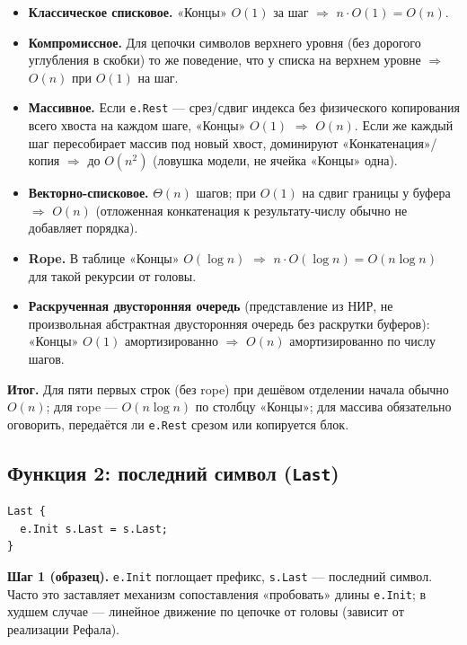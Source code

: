 \documentclass[12pt,a4paper]{article}
\newcommand{\bigO}{\ensuremath{O}}
\begin{document}
\begin{itemize}
  \item \textbf{Классическое списковое.} «Концы» \(O(1)\) за шаг \(\Rightarrow\) \(n\cdot O(1)=\bigO(n)\).
  \item \textbf{Компромиссное.} Для цепочки символов верхнего уровня (без дорогого углубления в скобки) то же поведение, что у списка на верхнем уровне \(\Rightarrow\) \(\bigO(n)\) при \(O(1)\) на шаг.
  \item \textbf{Массивное.} Если \texttt{e.Rest} --- срез/сдвиг индекса без физического копирования всего хвоста на каждом шаге, «Концы» \(O(1)\) \(\Rightarrow\) \(\bigO(n)\). Если же каждый шаг пересобирает массив под новый хвост, доминируют «Конкатенация»/копия \(\Rightarrow\) до \(\bigO(n^2)\) (ловушка модели, не ячейка «Концы» одна).
  \item \textbf{Векторно-списковое.} \(\Theta(n)\) шагов; при \(O(1)\) на сдвиг границы у буфера \(\Rightarrow\) \(\bigO(n)\) (отложенная конкатенация к результату-числу обычно не добавляет порядка).
  \item \textbf{Rope.} В таблице «Концы» \(O(\log n)\) \(\Rightarrow\) \(n\cdot O(\log n)=\bigO(n\log n)\) для такой рекурсии от головы.
  \item \textbf{Раскрученная двусторонняя очередь} (представление из НИР, не произвольная абстрактная двусторонняя очередь без раскрутки буферов): «Концы» \(O(1)\) амортизированно \(\Rightarrow\) \(\bigO(n)\) амортизированно по числу шагов.
\end{itemize}

\textbf{Итог.} Для пяти первых строк (без rope) при дешёвом отделении начала обычно \(\bigO(n)\); для rope --- \(\bigO(n\log n)\) по столбцу «Концы»; для массива обязательно оговорить, передаётся ли \texttt{e.Rest} срезом или копируется блок.

\subsection{Функция 2: последний символ (\texttt{Last})}

\begin{lstlisting}
Last {
  e.Init s.Last = s.Last;
}
\end{lstlisting}

\textbf{Шаг 1 (образец).} \texttt{e.Init} поглощает префикс, \texttt{s.Last} --- последний символ. Часто это заставляет механизм сопоставления «пробовать» длины \texttt{e.Init}; в худшем случае --- линейное движение по цепочке от головы (зависит от реализации Рефала).
\end{document}
